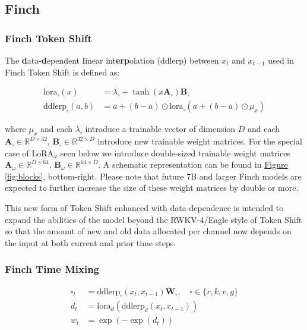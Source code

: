 \subsection{Finch}

\subsubsection{Finch Token Shift}

The \textbf{d}ata-\textbf{d}ependent \textbf{l}inear int\textbf{erp}olation (ddlerp) between $x_t$ and $x_{t-1}$ used in Finch Token Shift is defined as:

\begin{align}
\mathrm{lora}_\square(x) &= \lambda_\square + \tanh(x\bm{A}_\square)\bm{B}_\square \\
\mathrm{ddlerp}_\square (a, b) &= a + (b-a) \odot \mathrm{lora}_\square(a + (b-a) \odot \mu_x)
\end{align}

where $\mu_x$ and each $\lambda_\square$ introduce a trainable vector of dimension $D$ and each $\bm{A}_\square \in \mathbb{R}^{D \times 32}$, $\bm{B}_\square \in \mathbb{R}^{32 \times D}$ introduce new trainable weight matrices. For the special case of $\mathrm{LoRA}_\omega$ seen below we introduce double-sized trainable weight matrices $\bm{A}_\omega \in \mathbb{R}^{D \times 64}$, $\bm{B}_\omega \in \mathbb{R}^{64 \times D}$. A schematic representation can be found in \hyperref[fig:blocks]{Figure \ref*{fig:blocks}}, bottom-right. Please note that future 7B and larger Finch models are expected to further increase the size of these weight matrices by double or more.

This new form of Token Shift enhanced with data-dependence is intended to expand the abilities of the model beyond the RWKV-4/Eagle style of Token Shift so that the amount of new and old data allocated per channel now depends on the input at both current and prior time steps. 

\subsubsection{Finch Time Mixing}

\begin{align}\label{eq:token-shift6}
\square_{t} &= \mathrm{ddlerp}_{\square}(x_t, x_{t-1})\bm{W}_{\square}, \quad \square\in \{r,k,v,g\}\\
d_t &= \mathrm{lora}_d( \mathrm{ddlerp}_d ( x_t, x_{t-1} ) )\\
w_t &= \exp(-\exp(d_t))
\end{align}

